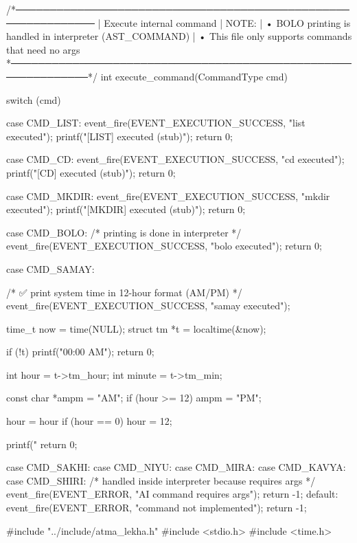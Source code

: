 \documentclass{article}
\begin{document}
/*──────────────────────────────────────────────────────────────
 | Execute internal command
 | NOTE:
 |  • BOLO printing is handled in interpreter (AST_COMMAND)
 |  • This file only supports commands that need no args
 *──────────────────────────────────────────────────────────────*/
int execute_command(CommandType cmd)
{
    switch (cmd) {

        case CMD_LIST:
            event_fire(EVENT_EXECUTION_SUCCESS, "list executed");
            printf("[LIST] executed (stub)\n");
            return 0;

        case CMD_CD:
            event_fire(EVENT_EXECUTION_SUCCESS, "cd executed");
            printf("[CD] executed (stub)\n");
            return 0;

        case CMD_MKDIR:
            event_fire(EVENT_EXECUTION_SUCCESS, "mkdir executed");
            printf("[MKDIR] executed (stub)\n");
            return 0;

        case CMD_BOLO:
            /* printing is done in interpreter */
            event_fire(EVENT_EXECUTION_SUCCESS, "bolo executed");
            return 0;

        case CMD_SAMAY: {
            /* ✅ print system time in 12-hour format (AM/PM) */
            event_fire(EVENT_EXECUTION_SUCCESS, "samay executed");

            time_t now = time(NULL);
            struct tm *t = localtime(&now);

            if (!t) {
                printf("00:00 AM\n");
                return 0;
            }

            int hour = t->tm_hour;
            int minute = t->tm_min;

            const char *ampm = "AM";
            if (hour >= 12) ampm = "PM";

            hour = hour %
            if (hour == 0) hour = 12;

            printf("%
            return 0;
        }

        case CMD_SAKHI:
        case CMD_NIYU:
        case CMD_MIRA:
        case CMD_KAVYA:
        case CMD_SHIRI:
            /* handled inside interpreter because requires args */
            event_fire(EVENT_ERROR, "AI command requires args");
            return -1;
        default:
            event_fire(EVENT_ERROR, "command not implemented");
            return -1;
    }
}
#include "../include/atma_lekha.h"
#include <stdio.h>
#include <time.h>
\end{document}
